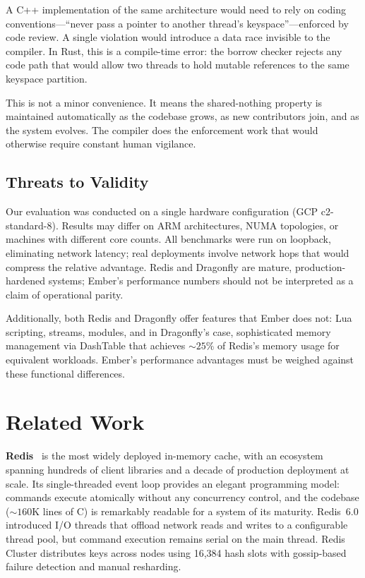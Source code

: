 \documentclass[conference]{IEEEtran}
\begin{document}
A C++ implementation of the same architecture would need to rely on
coding conventions---``never pass a pointer to another thread's
keyspace''---enforced by code review. A single violation would
introduce a data race invisible to the compiler. In Rust, this is
a compile-time error: the borrow checker rejects any code path that
would allow two threads to hold mutable references to the same
keyspace partition.

This is not a minor convenience. It means the shared-nothing property
is maintained automatically as the codebase grows, as new contributors
join, and as the system evolves. The compiler does the enforcement
work that would otherwise require constant human vigilance.

\subsection{Threats to Validity}

Our evaluation was conducted on a single hardware configuration (GCP
c2-standard-8). Results may differ on ARM architectures, NUMA
topologies, or machines with different core counts. All benchmarks
were run on loopback, eliminating network latency; real deployments
involve network hops that would compress the relative advantage.
Redis and Dragonfly are mature, production-hardened systems; Ember's
performance numbers should not be interpreted as a claim of
operational parity.

Additionally, both Redis and Dragonfly offer features that Ember
does not: Lua scripting, streams, modules, and in Dragonfly's case,
sophisticated memory management via DashTable that achieves
${\sim}25\%$ of Redis's memory usage for equivalent workloads.
Ember's performance advantages must be weighed against these
functional differences.


\section{Related Work}
\label{sec:related}

\textbf{Redis}~\cite{redis} is the most widely deployed in-memory
cache, with an ecosystem spanning hundreds of client libraries and
a decade of production deployment at scale. Its single-threaded event
loop provides an elegant programming model: commands execute
atomically without any concurrency control, and the codebase
(${\sim}160$K lines of C) is remarkably readable for a system of its
maturity. Redis~6.0 introduced I/O threads that offload network
reads and writes to a configurable thread pool, but command execution
remains serial on the main thread. Redis Cluster distributes keys
across nodes using 16,384 hash slots with gossip-based failure
detection and manual resharding.
\end{document}
